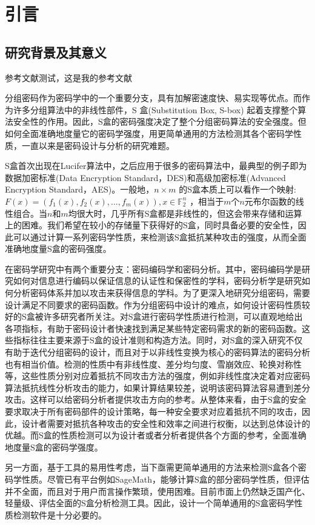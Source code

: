 \documentclass{xduugthesis}
\begin{document}
\frontmatter
\mainmatter
\chapter{引言}
\section{研究背景及其意义}
参考文献测试\cite{Magma}，这是我的参考文献


分组密码作为密码学中的一个重要分支，具有加解密速度快、易实现等优点。而作为许多分组算法中的非线性部件，S 盒(Substitution Box, S-box) 起着支撑整个算法安全性的作用。因此，S盒的密码强度决定了整个分组密码算法的安全强度。但如何全面准确地度量它的密码学强度，用更简单通用的方法检测其各个密码学性质，一直以来是密码设计与分析的研究难题。\par
S盒首次出现在Lucifer算法中，之后应用于很多的密码算法中，最典型的例子即为数据加密标准(Data Encryption Standard，DES)和高级加密标准(Advanced Encryption Standard，AES)。一般地，$n\times m$ 的S盒本质上可以看作一个映射:$F(x) = (f_1(x), f_2(x),\dots , f_m(x)), x\in \mathbb{F}_2^n$ ，相当于$m$个$ n$元布尔函数的线性组合。当$n$和$m$均很大时，几乎所有S盒都是非线性的，但这会带来存储和运算上的困难\cite{冯登国2000分组密码的设计与分析}。我们希望在较小的存储量下获得好的S盒，同时具备必要的安全性，因此可以通过计算一系列密码学性质，来检测该S盒抵抗某种攻击的强度，从而全面准确地度量S盒的密码强度。\par
在密码学研究中有两个重要分支：密码编码学和密码分析。其中，密码编码学是研究如何对信息进行编码以保证信息的认证性和保密性的学科，密码分析学是研究如何分析密码体系并加以攻击来获得信息的学科。为了更深入地研究分组密码，需要设计满足不同要求的密码函数。作为分组密码中设计的难点，如何设计密码性质较好的S盒被许多研究者所关注。对S盒进行密码学性质进行检测，可以直观地给出各项指标，有助于密码设计者快速找到满足某些特定密码需求的新的密码函数。这些指标往往主要来源于S盒的设计准则和构造方法。同时，对S盒的深入研究不仅有助于迭代分组密码的设计，而且对于以非线性变换为核心的密码算法的密码分析也有相当价值。检测的性质中有非线性度\cite{pieprzyk1988towards}、差分均匀度\cite{DBLP:conf/fse/Nyberg94}、雪崩效应、轮换对称性等，这些性质分别对应着抵抗不同攻击方法的强度，例如非线性度决定着对应密码算法抵抗线性分析攻击的能力，如果计算结果较差，说明该密码算法容易遭到差分攻击。这样可以给密码分析者提供攻击方向的参考。从整体来看，由于S盒的安全要求取决于所有密码部件的设计策略，每一种安全要求对应着抵抗不同的攻击，因此，设计者需要对抵抗各种攻击的安全性和效率之间进行权衡，以达到总体设计的优越。而S盒的性质检测可以为设计者或者分析者提供各个方面的参考，全面准确地度量S盒的密码学强度。\par
另一方面，基于工具的易用性考虑，当下亟需更简单通用的方法来检测S盒各个密码学性质。尽管已有平台例如SageMath\cite{SageMath}，能够计算S盒的部分密码学性质，但评估并不全面，而且对于用户而言操作繁琐，使用困难。目前市面上仍然缺乏国产化、轻量级、评估全面的S盒分析检测工具。因此，设计一个简单通用的S盒密码学性质检测软件是十分必要的。\par
\end{document}
